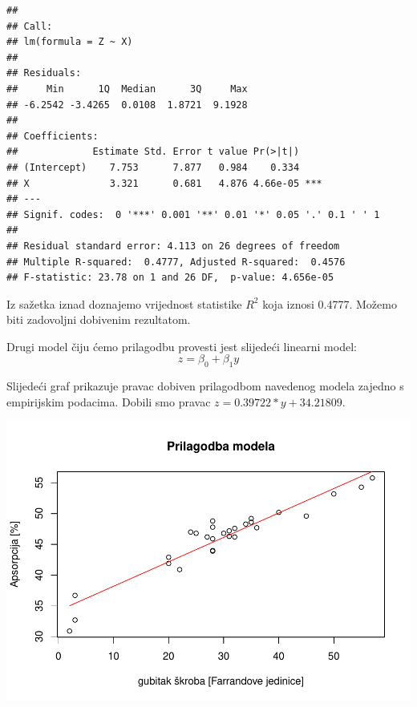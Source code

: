 \documentclass[]{article}
\newenvironment{Shaded}{\begin{snugshade}}{\end{snugshade}}
\newcommand{\KeywordTok}[1]{\textcolor[rgb]{0.13,0.29,0.53}{\textbf{{#1}}}}
\newcommand{\DataTypeTok}[1]{\textcolor[rgb]{0.13,0.29,0.53}{{#1}}}
\newcommand{\StringTok}[1]{\textcolor[rgb]{0.31,0.60,0.02}{{#1}}}
\newcommand{\NormalTok}[1]{{#1}}
\begin{document}
\begin{verbatim}
## 
## Call:
## lm(formula = Z ~ X)
## 
## Residuals:
##     Min      1Q  Median      3Q     Max 
## -6.2542 -3.4265  0.0108  1.8721  9.1928 
## 
## Coefficients:
##             Estimate Std. Error t value Pr(>|t|)    
## (Intercept)    7.753      7.877   0.984    0.334    
## X              3.321      0.681   4.876 4.66e-05 ***
## ---
## Signif. codes:  0 '***' 0.001 '**' 0.01 '*' 0.05 '.' 0.1 ' ' 1
## 
## Residual standard error: 4.113 on 26 degrees of freedom
## Multiple R-squared:  0.4777, Adjusted R-squared:  0.4576 
## F-statistic: 23.78 on 1 and 26 DF,  p-value: 4.656e-05
\end{verbatim}

Iz sažetka iznad doznajemo vrijednost statistike \(R^2\) koja iznosi
0.4777. Možemo biti zadovoljni dobivenim rezultatom.

Drugi model čiju ćemo prilagodbu provesti jest slijedeći linearni model:
\[z = \beta_0 + \beta_1 y \]

\begin{Shaded}
\end{Shaded}

Slijedeći graf prikazuje pravac dobiven prilagodbom navedenog modela
zajedno s empirijskim podacima. Dobili smo pravac
\(z = 0.39722*y + 34.21809\).

\begin{Shaded}
\end{Shaded}

\includegraphics{Izvjestaj_files/figure-latex/unnamed-chunk-31-1.pdf}
\end{document}
